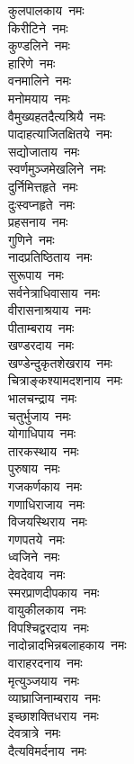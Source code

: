 \begin{multicols}{2}
\begin{flushleft}
कुलपालकाय~नमः\\
किरीटिने~नमः\\
कुण्डलिने~नमः\\
हारिणे~नमः\hfill{}\\
वनमालिने~नमः\\
मनोमयाय~नमः\\
वैमुख्यहतदैत्यश्रियै~नमः\\
पादाहत्याजितक्षितये~नमः\\
सद्योजाताय~नमः\\
स्वर्णमुञ्जमेखलिने~नमः\\
दुर्निमित्तहृते~नमः\\
दुःस्वप्नहृते~नमः\\
प्रहसनाय~नमः\\
गुणिने~नमः\hfill{}\\
नादप्रतिष्ठिताय~नमः\\
सुरूपाय~नमः\\
सर्वनेत्राधिवासाय~नमः\\
वीरासनाश्रयाय~नमः\\
पीताम्बराय~नमः\\
खण्डरदाय~नमः\\
खण्डेन्दुकृतशेखराय~नमः\\
चित्राङ्कश्यामदशनाय~नमः\\
भालचन्द्राय~नमः\\
चतुर्भुजाय~नमः\hfill{}\\
योगाधिपाय~नमः\\
तारकस्थाय~नमः\\
पुरुषाय~नमः\\
गजकर्णकाय~नमः\\
गणाधिराजाय~नमः\\
विजयस्थिराय~नमः\\
गणपतये~नमः\\
ध्वजिने~नमः\\
देवदेवाय~नमः\\
स्मरप्राणदीपकाय~नमः\hfill{}\\
वायुकीलकाय~नमः\\
विपश्चिद्वरदाय~नमः\\
नादोन्नादभिन्नबलाहकाय~नमः\\
वाराहरदनाय~नमः\\
मृत्युञ्जयाय~नमः\\
व्याघ्राजिनाम्बराय~नमः\\
इच्छाशक्तिधराय~नमः\\
देवत्रात्रे~नमः\\
दैत्यविमर्दनाय~नमः\\

\end{flushleft}
\end{multicols}
